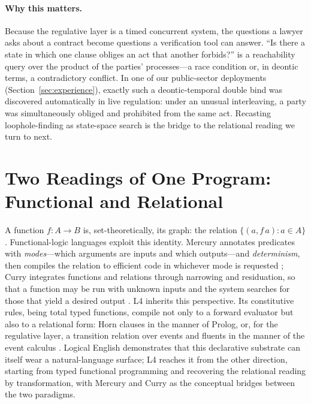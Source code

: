 \documentclass[sigconf,nonacm]{acmart}
\begin{document}
\paragraph{Why this matters.}
Because the regulative layer is a timed concurrent system, the questions a
lawyer asks about a contract become questions a verification tool can
answer. ``Is there a state in which one clause obliges an act that another
forbids?'' is a reachability query over the product of the parties'
processes---a race condition or, in deontic terms, a contradictory
conflict. In one of our public-sector deployments
(Section~\ref{sec:experience}), exactly such a deontic-temporal double bind
was discovered automatically in live regulation: under an unusual
interleaving, a party was simultaneously obliged and prohibited from the
same act. Recasting loophole-finding as state-space search is the bridge to
the relational reading we turn to next.

\section{Two Readings of One Program: Functional and Relational}\label{sec:relational}
A function $f : A \to B$ is, set-theoretically, its graph: the relation
$\{(a, f\,a) : a \in A\}$. Functional-logic languages exploit this
identity. Mercury annotates predicates with \emph{modes}---which arguments
are inputs and which outputs---and \emph{determinism}, then compiles the
relation to efficient code in whichever mode is requested
\cite{somogyi1996mercury}; Curry integrates functions and relations through
narrowing and residuation, so that a function may be run with unknown inputs
and the system searches for those that yield a desired output
\cite{antoy2010flp,hanus2013curry}. L4 inherits this perspective. Its
constitutive rules, being total typed functions, compile not only to a
forward evaluator but also to a relational form: Horn clauses in the manner
of Prolog, or, for the regulative layer, a transition relation over events
and fluents in the manner of the event calculus
\cite{kowalski1986events}. Logical English \cite{kowalski2021logicalenglish}
demonstrates that this declarative substrate can itself wear a
natural-language surface; L4 reaches it from the other direction, starting
from typed functional programming and recovering the relational reading by
transformation, with Mercury and Curry as the conceptual bridges between the
two paradigms.
\end{document}
